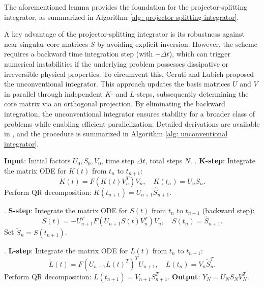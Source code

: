\documentclass[preprint,11pt]{elsarticle}
\begin{document}
The aforementioned lemma provides the foundation for the projector-splitting integrator, as summarized in Algorithm \ref{alg: projector splitting integrator}.

A key advantage of the projector-splitting integrator is its robustness against near-singular core matrices $S$ by avoiding explicit inversion. However, the scheme requires a backward time integration step (with $-\Delta t$), which can trigger numerical instabilities if the underlying problem possesses dissipative or irreversible physical properties. To circumvent this, Ceruti and Lubich \cite{cerutiUnconventionalRobustIntegrator2022} proposed the unconventional integrator. This approach updates the basis matrices $U$ and $V$ in parallel through independent $K$- and $L$-steps, subsequently determining the core matrix via an orthogonal projection. By eliminating the backward integration, the unconventional integrator ensures stability for a broader class of problems while enabling efficient parallelization. Detailed derivations are available in \cite{cerutiUnconventionalRobustIntegrator2022}, and the procedure is summarized in Algorithm \ref{alg: unconventional integrator}.


\begin{algorithm}[htbp]
    \caption{The projector-splitting integrator}
    \label{alg: projector splitting integrator}
    \begin{algorithmic}
        \STATE \textbf{Input}: Initial factors $U_0, S_0, V_0$, time step $\Delta t$, total steps $N$.
            . \textbf{K-step}: Integrate the matrix ODE for $K(t)$ from $t_n$ to $t_{n+1}$:
            \begin{equation*}
                \dot{K}(t) = F(K(t)V_n^T) V_n, \quad K(t_n) = U_n S_n.
            \end{equation*}
            Perform QR decomposition: $K(t_{n+1}) = U_{n+1} \hat{S}_{n+1}$.
            
            . \textbf{S-step}: Integrate the matrix ODE for $S(t)$ from $t_n$ to $t_{n+1}$ (backward step):
            \begin{equation*}
                \dot{S}(t) = -U_{n+1}^T F(U_{n+1} S(t) V_n^T) V_n, \quad S(t_n) = \hat{S}_{n+1}.
            \end{equation*}
            Set $\tilde{S}_n = S(t_{n+1})$.
            
            . \textbf{L-step}: Integrate the matrix ODE for $L(t)$ from $t_n$ to $t_{n+1}$:
            \begin{equation*}
                \dot{L}(t) = F(U_{n+1} L(t)^T)^T U_{n+1}, \quad L(t_n) = V_n \tilde{S}_n^T.
            \end{equation*}
            Perform QR decomposition: $L(t_{n+1}) = V_{n+1} S_{n+1}^T$.
        \ENDFOR
        \STATE \textbf{Output}: $Y_N = U_N S_N V_N^T$.
    \end{algorithmic}
\end{algorithm}
\end{document}
